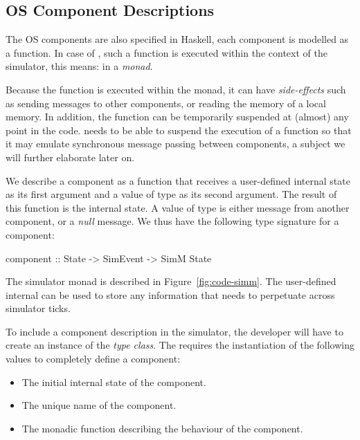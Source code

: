 \subsection{OS Component Descriptions}

The OS components are also specified in Haskell, each component is modelled as a function.
In case of \soosim, such a function is executed within the context of the simulator, this means: in a \emph{monad}.

Because the function is executed within the monad, it can have \emph{side-effects} such as sending messages to other components, or reading the memory of a local memory.
In addition, the function can be temporarily suspended at (almost) any point in the code.
\soosim needs to be able to suspend the execution of a function so that it may emulate synchronous message passing between components, a subject we will further elaborate later on.

We describe a component as a function that receives a user-defined internal state as its first argument and a value of type  as its second argument.
The result of this function is the internal state.
A value of type  is either message from another component, or a \emph{null} message.
We thus have the following type signature for a component:
\begin{code}
component :: State -> SimEvent -> SimM State
\end{code}

The simulator monad  is described in Figure~\ref{fig:code-simm}. 
The user-defined internal  can be used to store any information that needs to perpetuate across simulator ticks.

To include a component description in the simulator, the developer will have to create an instance of the  \emph{type class}.
The  requires the instantiation of the following values to completely define a component:

\begin{itemize}
  \item The initial internal state of the component.
  \item The unique name of the component.
  \item The monadic function describing the behaviour of the component.
\end{itemize}

